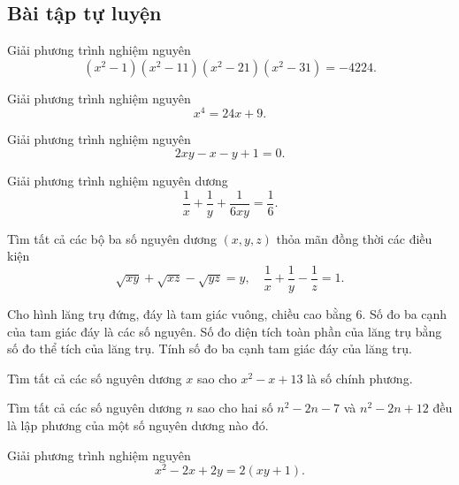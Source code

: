 \subsection*{Bài tập tự luyện}

\begin{btt}
Giải phương trình nghiệm nguyên
\[\left(x^{2}-1\right)\left(x^{2}-11\right)\left(x^{2}-21\right)\left(x^{2}-31\right)=-4224.\]
\end{btt}

\begin{btt}
Giải phương trình nghiệm nguyên
$$x^{4}=24x+9.$$
\end{btt}

\begin{btt}
Giải phương trình nghiệm nguyên $$2xy-x-y+1=0.$$
\end{btt}

\begin{btt}
Giải phương trình nghiệm nguyên dương
\[\dfrac{1}{x}+\dfrac{1}{y}+\dfrac{1}{6xy} = \dfrac{1}{6}.\]
\end{btt}

\begin{btt}
Tìm tất cả các bộ ba số nguyên dương $(x,y,z)$ thỏa mãn đồng thời các điều kiện $$\sqrt{xy}+\sqrt{xz}-\sqrt{yz}=y,\quad  \dfrac{1}{x}+\dfrac{1}{y}-\dfrac{1}{z}=1.$$
\end{btt}

\begin{btt}
Cho hình lăng trụ đứng, đáy là tam giác vuông, chiều cao bằng $6.$ Số đo ba cạnh của tam giác đáy là các số nguyên. Số đo diện tích toàn phần của lăng trụ bằng số đo thể tích của lăng trụ. Tính số đo ba cạnh tam giác đáy của lăng trụ.
\end{btt}

\begin{btt}
Tìm tất cả các số nguyên dương $x$ sao cho $x^2-x+13$ là số chính phương.
\end{btt}

\begin{btt}
Tìm tất cả các số nguyên dương $n$ sao cho hai số $n^2-2n-7$ và $n^2-2n+12$ đều là lập phương của một số nguyên dương nào đó.
\end{btt}

\begin{btt}
Giải phương trình nghiệm nguyên $$x^2-2x+2y=2(xy+1).$$
\end{btt}

